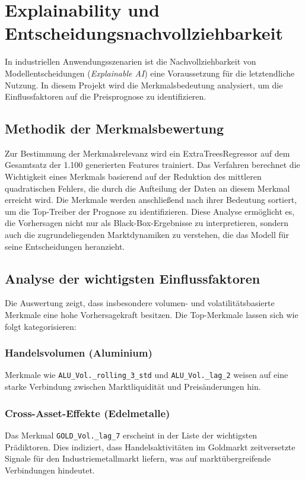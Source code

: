 \section{Explainability und Entscheidungsnachvollziehbarkeit}
\label{sec:explainability}

In industriellen Anwendungsszenarien ist die Nachvollziehbarkeit von Modellentscheidungen (\emph{Explainable AI}) eine Voraussetzung für die letztendliche Nutzung.
In diesem Projekt wird die Merkmalsbedeutung analysiert, um die Einflussfaktoren auf die Preisprognose zu identifizieren.

\subsection{Methodik der Merkmalsbewertung}
Zur Bestimmung der Merkmalsrelevanz wird ein ExtraTreesRegressor auf dem Gesamtsatz der 1.100 generierten Features trainiert.
Das Verfahren berechnet die Wichtigkeit eines Merkmals basierend auf der Reduktion des mittleren quadratischen Fehlers, die durch die Aufteilung der Daten an diesem Merkmal erreicht wird.
Die Merkmale werden anschließend nach ihrer Bedeutung sortiert, um die Top-Treiber der Prognose zu identifizieren.
Diese Analyse ermöglicht es, die Vorhersagen nicht nur als Black-Box-Ergebnisse zu interpretieren, sondern auch die zugrundeliegenden Marktdynamiken zu verstehen, die das Modell für seine Entscheidungen heranzieht.


\subsection{Analyse der wichtigsten Einflussfaktoren}
Die Auswertung zeigt, dass insbesondere volumen- und volatilitätsbasierte Merkmale eine hohe Vorhersagekraft besitzen. Die Top-Merkmale lassen sich wie folgt kategorisieren:

\subsubsection{Handelsvolumen (Aluminium)}
Merkmale wie \texttt{ALU\_Vol.\_rolling\_3\_std} und \texttt{ALU\_Vol.\_lag\_2} weisen auf eine starke Verbindung zwischen Marktliquidität und Preisänderungen hin.

\subsubsection{Cross-Asset-Effekte (Edelmetalle)}
Das Merkmal \texttt{GOLD\_Vol.\_lag\_7} erscheint in der Liste der wichtigsten Prädiktoren.
Dies indiziert, dass Handelsaktivitäten im Goldmarkt zeitversetzte Signale für den Industriemetallmarkt liefern, was auf marktübergreifende Verbindungen hindeutet.


